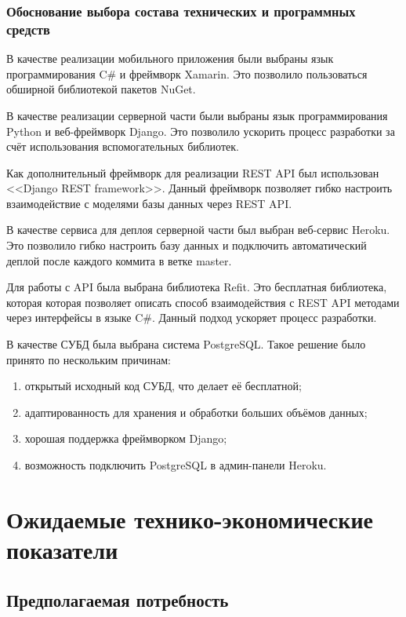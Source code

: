 \documentclass{../includes/TechDoc}
\begin{document}
    \subsubsection{Обоснование выбора состава технических и программных средств}

    В качестве реализации мобильного приложения были выбраны язык программирования C\# и фреймворк Xamarin.
    Это позволило пользоваться обширной библиотекой пакетов NuGet.

    В качестве реализации серверной части были выбраны язык программирования Python и веб-фреймворк Django.
    Это позволило ускорить процесс разработки за счёт использования вспомогательных библиотек.

    Как дополнительный фреймворк для реализации REST API был использован <<Django REST framework>>.
    Данный фреймворк позволяет гибко настроить взаимодействие с моделями базы данных через REST API\@.

    В качестве сервиса для деплоя серверной части был выбран веб-сервис Heroku.
    Это позволило гибко настроить базу данных и подключить автоматический деплой после каждого коммита в ветке master.

    Для работы с API была выбрана библиотека Refit.
    Это бесплатная библиотека, которая которая позволяет описать способ взаимодействия с REST API методами через
    интерфейсы в языке C\#.
    Данный подход ускоряет процесс разработки.

    В качестве СУБД была выбрана система PostgreSQL\@.
    Такое решение было принято по нескольким причинам:
    \begin{enumerate}
        \item открытый исходный код СУБД, что делает её бесплатной;
        \item адаптированность для хранения и обработки больших объёмов данных;
        \item хорошая поддержка фреймворком Django;
        \item возможность подключить PostgreSQL в админ-панели Heroku.
    \end{enumerate}


    \section{Ожидаемые технико-экономические показатели}

    \subsection{Предполагаемая потребность}
\end{document}
